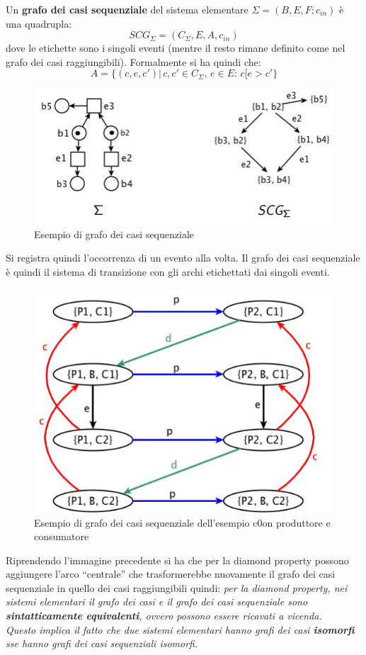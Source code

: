 \documentclass[a4paper,12pt, oneside]{book}
\begin{document}
\begin{definizione}
  Un \textbf{grafo dei casi sequenziale} del sistema elementare
  $\Sigma=(B,E,F;c_{in})$ è una quadrupla:
  \[SCG_\Sigma=(C_\Sigma,E,A,c_{in})\]
  dove le etichette sono i singoli eventi (mentre il resto rimane definito come
  nel grafo dei casi raggiungibili). Formalmente si ha quindi che:
  \[A=\{(c,e,c')|\,c,c'\in C_\Sigma,\,e\in E:\, c[e>c'\}\]
  \begin{figure}[H]
    \centering
    \includegraphics[scale = 0.5]{img/seq3.jpg}
    \caption{Esempio di grafo dei casi sequenziale}
  \end{figure}
  Si registra quindi l'occorrenza di un evento alla volta. Il grafo dei casi
  sequenziale è quindi il sistema di transizione con gli archi etichettati dai
  singoli eventi.
  \begin{figure}[H]
    \centering
    \includegraphics[scale = 0.4]{img/seqq.jpg}
    \caption{Esempio di grafo dei casi sequenziale dell'esempio c0on produttore
      e consumatore}
  \end{figure}
\end{definizione}
Riprendendo l'immagine precedente si ha che per la diamond property possono
aggiungere l'arco ``centrale'' che trasformerebbe nuovamente il grafo dei casi
sequenziale in quello dei casi raggiungibili quindi:
\textit{per la diamond property, nei sistemi elementari il grafo dei casi e il
  grafo dei casi sequenziale sono \textbf{sintatticamente equivalenti}, ovvero
  possono essere ricavati a vicenda.\\
  Questo implica il fatto che due sistemi elementari hanno grafi dei casi
  \textbf{isomorfi} sse hanno grafi dei casi sequenziali isomorfi.}
\end{document}
